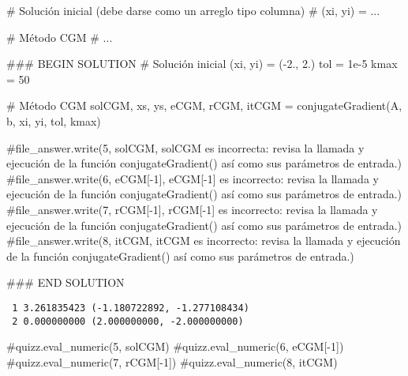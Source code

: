 \documentclass[
  letterpaper,
  DIV=11,
  numbers=noendperiod]{scrreprt}
\newenvironment{Shaded}{\begin{snugshade}}{\end{snugshade}}
\newcommand{\CommentTok}[1]{\textcolor[rgb]{0.37,0.37,0.37}{#1}}
\newcommand{\DecValTok}[1]{\textcolor[rgb]{0.68,0.00,0.00}{#1}}
\newcommand{\FloatTok}[1]{\textcolor[rgb]{0.68,0.00,0.00}{#1}}
\newcommand{\NormalTok}[1]{\textcolor[rgb]{0.00,0.23,0.31}{#1}}
\newcommand{\OperatorTok}[1]{\textcolor[rgb]{0.37,0.37,0.37}{#1}}
\newcommand{\RegionMarkerTok}[1]{\textcolor[rgb]{0.00,0.23,0.31}{#1}}
\begin{document}
\begin{Shaded}
\begin{Highlighting}[]
\CommentTok{\# Solución inicial (debe darse como un arreglo tipo columna)}
\CommentTok{\# (xi, yi) = ...}

\CommentTok{\# Método CGM}
\CommentTok{\# ...}

\CommentTok{\#\#\# }\RegionMarkerTok{BEGIN}\CommentTok{ SOLUTION}
\CommentTok{\# Solución inicial}
\NormalTok{(xi, yi) }\OperatorTok{=}\NormalTok{ (}\OperatorTok{{-}}\FloatTok{2.}\NormalTok{, }\FloatTok{2.}\NormalTok{)}
\NormalTok{tol }\OperatorTok{=} \FloatTok{1e{-}5}
\NormalTok{kmax }\OperatorTok{=} \DecValTok{50}

\CommentTok{\# Método CGM}
\NormalTok{solCGM, xs, ys, eCGM, rCGM, itCGM }\OperatorTok{=}\NormalTok{ conjugateGradient(A, b, xi, yi, tol, kmax)}

\CommentTok{\#file\_answer.write(\textquotesingle{}5\textquotesingle{}, solCGM, \textquotesingle{}solCGM es incorrecta: revisa la llamada y ejecución de la función conjugateGradient() así como sus parámetros de entrada.\textquotesingle{})}
\CommentTok{\#file\_answer.write(\textquotesingle{}6\textquotesingle{}, eCGM[{-}1], \textquotesingle{}eCGM[{-}1] es incorrecto: revisa la llamada y ejecución de la función conjugateGradient() así como sus parámetros de entrada.\textquotesingle{})}
\CommentTok{\#file\_answer.write(\textquotesingle{}7\textquotesingle{}, rCGM[{-}1], \textquotesingle{}rCGM[{-}1] es incorrecto: revisa la llamada y ejecución de la función conjugateGradient() así como sus parámetros de entrada.\textquotesingle{})}
\CommentTok{\#file\_answer.write(\textquotesingle{}8\textquotesingle{}, itCGM, \textquotesingle{}itCGM es incorrecto: revisa la llamada y ejecución de la función conjugateGradient() así como sus parámetros de entrada.\textquotesingle{})}

\CommentTok{\#\#\# }\RegionMarkerTok{END}\CommentTok{ SOLUTION}
\end{Highlighting}
\end{Shaded}

\begin{verbatim}
 1 3.261835423 (-1.180722892, -1.277108434)
 2 0.000000000 (2.000000000, -2.000000000)
\end{verbatim}

\begin{Shaded}
\begin{Highlighting}[]
\CommentTok{\#quizz.eval\_numeric(\textquotesingle{}5\textquotesingle{}, solCGM)}
\CommentTok{\#quizz.eval\_numeric(\textquotesingle{}6\textquotesingle{}, eCGM[{-}1])}
\CommentTok{\#quizz.eval\_numeric(\textquotesingle{}7\textquotesingle{}, rCGM[{-}1])}
\CommentTok{\#quizz.eval\_numeric(\textquotesingle{}8\textquotesingle{}, itCGM)}
\end{Highlighting}
\end{Shaded}
\end{document}
